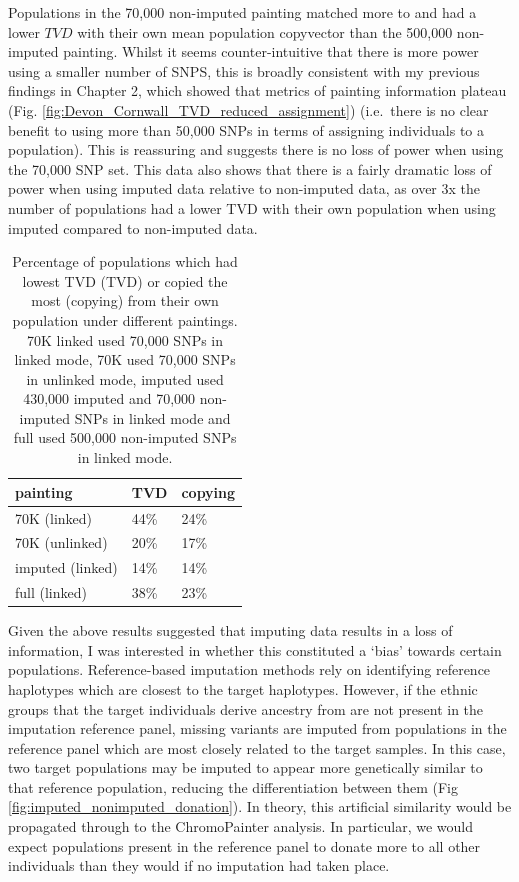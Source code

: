 Populations in the 70,000 non-imputed painting matched more to and had a lower $TVD$ with their own mean population copyvector than the 500,000 non-imputed painting. Whilst it seems counter-intuitive that there is more power using a smaller number of SNPS, this is broadly consistent with my previous findings in Chapter 2, which showed that metrics of painting information plateau (Fig. \ref{fig:Devon_Cornwall_TVD_reduced_assignment}) (i.e.\ there is no clear benefit to using more than 50,000 SNPs in terms of assigning individuals to a population). This is reassuring and suggests there is no loss of power when using the 70,000 SNP set. This data also shows that there is a fairly dramatic loss of power when using imputed data relative to non-imputed data, as over 3x the number of populations had a lower TVD with their own population when using imputed compared to non-imputed data.

\begin{table}
\centering
\small
\begin{tabular}{l|l|l}
\toprule
painting & TVD & copying\\
\midrule
70K (linked) & 44\% & 24\%\\
70K (unlinked) & 20\% & 17\%\\
imputed (linked) & 14\% & 14\%\\
full (linked) & 38\% & 23\%\\
\bottomrule
\end{tabular}
\caption{Percentage of populations which had lowest TVD (TVD) or copied the most (copying) from their own population under different paintings. 70K linked used 70,000 SNPs in linked mode, 70K used 70,000 SNPs in unlinked mode, imputed used 430,000 imputed and 70,000 non-imputed SNPs in linked mode and full used 500,000 non-imputed SNPs in linked mode.}
\label{table:TVD_copying}
\end{table}

Given the above results suggested that imputing data results in a loss of information, I was interested in whether this constituted a `bias' towards certain populations. Reference-based imputation methods rely on identifying reference haplotypes which are closest to the target haplotypes. However, if the ethnic groups that the target individuals derive ancestry from are not present in the imputation reference panel, missing variants are imputed from populations in the reference panel which are most closely related to the target samples. In this case, two target populations may be imputed to appear more genetically similar to that reference population, reducing the differentiation between them (Fig \ref{fig:imputed_nonimputed_donation}). In theory, this artificial similarity would be propagated through to the ChromoPainter analysis. In particular, we would expect populations present in the reference panel to donate more to all other individuals than they would if no imputation had taken place.  

